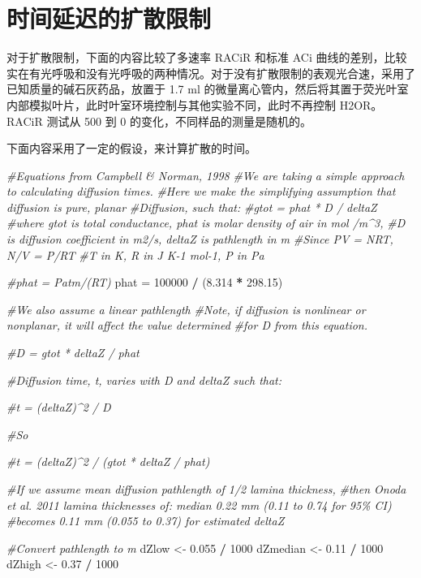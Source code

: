 \documentclass[
]{krantz}
\makeatletter
\newenvironment{Shaded}{\begin{snugshade}}{\end{snugshade}}
\newcommand{\CommentTok}[1]{\textcolor[rgb]{0.56,0.35,0.01}{\textit{#1}}}
\newcommand{\DecValTok}[1]{\textcolor[rgb]{0.00,0.00,0.81}{#1}}
\newcommand{\FloatTok}[1]{\textcolor[rgb]{0.00,0.00,0.81}{#1}}
\newcommand{\NormalTok}[1]{#1}
\newcommand{\OperatorTok}[1]{\textcolor[rgb]{0.81,0.36,0.00}{\textbf{#1}}}
\newcommand{\StringTok}[1]{\textcolor[rgb]{0.31,0.60,0.02}{#1}}
\newenvironment{kframe}{%
\medskip{}
\setlength{\fboxsep}{.8em}
 \def\at@end@of@kframe{}%
 \ifinner\ifhmode%
  \def\at@end@of@kframe{\end{minipage}}%
  \begin{minipage}{\columnwidth}%
 \fi\fi%
 \def\FrameCommand##1{\hskip\@totalleftmargin \hskip-\fboxsep
 \colorbox{shadecolor}{##1}\hskip-\fboxsep
     \hskip-\linewidth \hskip-\@totalleftmargin \hskip\columnwidth}%
 \MakeFramed {\advance\hsize-\width
   \@totalleftmargin\z@ \linewidth\hsize
   \@setminipage}}%
 {\par\unskip\endMakeFramed%
 \at@end@of@kframe}
\renewenvironment{Shaded}{\begin{kframe}}{\end{kframe}}
\makeatother
\begin{document}
\hypertarget{multi11}{%
\section{时间延迟的扩散限制}\label{multi11}}

对于扩散限制，下面的内容比较了多速率 RACiR 和标准 ACi 曲线的差别，比较实在有光呼吸和没有光呼吸的两种情况。对于没有扩散限制的表观光合速，采用了已知质量的碱石灰药品，放置于 1.7 ml 的微量离心管内，然后将其置于荧光叶室内部模拟叶片，此时叶室环境控制与其他实验不同，此时不再控制 H2OR。RACiR 测试从 500 到 0 的变化，不同样品的测量是随机的。

下面内容采用了一定的假设，来计算扩散的时间。

\begin{Shaded}
\begin{Highlighting}[]
\CommentTok{\#Equations from Campbell \& Norman, 1998}
\CommentTok{\#We are taking a simple approach to calculating diffusion times.}
\CommentTok{\#Here we make the simplifying assumption that diffusion is pure, planar}
\CommentTok{\#Diffusion, such that:}
\CommentTok{\#gtot = phat * D / deltaZ}
\CommentTok{\#where gtot is total conductance, phat is molar density of air in mol /m\^{}3,}
\CommentTok{\#D is diffusion coefficient in m2/s, deltaZ is pathlength in m}
\CommentTok{\#Since PV = NRT, N/V = P/RT}
\CommentTok{\#T in K, R in J K{-}1 mol{-}1, P in Pa}

\CommentTok{\#phat = Patm/(RT)}
\NormalTok{phat =}\StringTok{ }\DecValTok{100000} \OperatorTok{/}\StringTok{ }\NormalTok{(}\FloatTok{8.314} \OperatorTok{*}\StringTok{ }\FloatTok{298.15}\NormalTok{)}

\CommentTok{\#We also assume a linear pathlength}
\CommentTok{\#Note, if diffusion is nonlinear or nonplanar, it will affect the value determined}
\CommentTok{\#for D from this equation.}

\CommentTok{\#D = gtot * deltaZ / phat}

\CommentTok{\#Diffusion time, t, varies with D and deltaZ such that:}

\CommentTok{\#t = (deltaZ)\^{}2 / D}

\CommentTok{\#So}

\CommentTok{\#t = (deltaZ)\^{}2 / (gtot * deltaZ / phat)}

\CommentTok{\#If we assume mean diffusion pathlength of 1/2 lamina thickness,}
\CommentTok{\#then Onoda et al. 2011 lamina thicknesses of: median 0.22 mm (0.11 to 0.74 for 95\% CI)}
\CommentTok{\#becomes 0.11 mm (0.055 to 0.37) for estimated deltaZ}

\CommentTok{\#Convert pathlength to m}
\NormalTok{dZlow \textless{}{-}}\StringTok{ }\FloatTok{0.055} \OperatorTok{/}\StringTok{ }\DecValTok{1000}
\NormalTok{dZmedian \textless{}{-}}\StringTok{ }\FloatTok{0.11} \OperatorTok{/}\StringTok{ }\DecValTok{1000}
\NormalTok{dZhigh \textless{}{-}}\StringTok{ }\FloatTok{0.37} \OperatorTok{/}\StringTok{ }\DecValTok{1000}
\end{Highlighting}
\end{Shaded}
\end{document}
